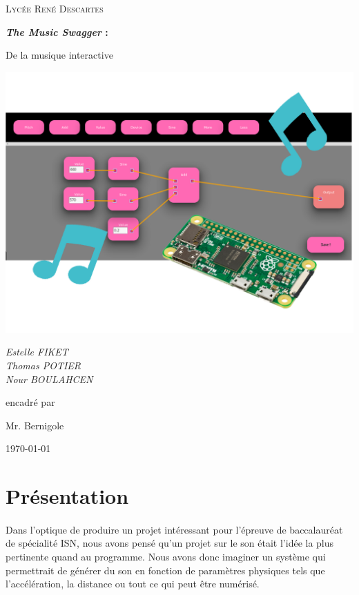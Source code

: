 \documentclass[12pt]{article}
\begin{document}
	\begin{titlepage}
		\centering
		{\scshape\LARGE Lycée René Descartes \par}
		\vspace{1cm}
		{\huge\bfseries \textit{The Music Swagger} :\par De la musique interactive\par}
		\includegraphics[height=10cm]{presentation_image}
		
		{\Large\itshape Estelle FIKET\\Thomas POTIER\\Nour BOULAHCEN\par}
		\vfill
		encadré par\par
		Mr. Bernigole
		
		\vfill
		
		{\large \today\par}
	\end{titlepage}
	\tableofcontents
	\newpage
	\section{Présentation}
	\paragraph{}
	Dans l'optique de produire un projet intéressant pour l'épreuve de baccalauréat de spécialité ISN, nous avons pensé qu'un projet sur le son était l'idée la plus pertinente quand au programme. Nous avons donc imaginer un système qui permettrait de générer du son en fonction de paramètres physiques tels que l'accélération, la distance ou tout ce qui peut être numérisé.
\end{document}
